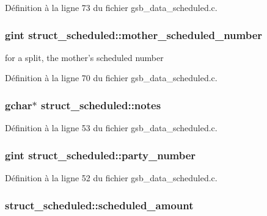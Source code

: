 Définition à la ligne 73 du fichier gsb\_\-data\_\-scheduled.c.

\subsubsection[{mother\_\-scheduled\_\-number}]{\setlength{\rightskip}{0pt plus 5cm}gint {\bf struct\_\-scheduled::mother\_\-scheduled\_\-number}}\label{structstruct__scheduled_a9bf031909d43bb5c36e1f0361b708586}
for a split, the mother's scheduled number 

Définition à la ligne 70 du fichier gsb\_\-data\_\-scheduled.c.

\subsubsection[{notes}]{\setlength{\rightskip}{0pt plus 5cm}gchar$\ast$ {\bf struct\_\-scheduled::notes}}\label{structstruct__scheduled_a4f450340b3955f3cad7a9cf4d683cf0b}


Définition à la ligne 53 du fichier gsb\_\-data\_\-scheduled.c.

\subsubsection[{party\_\-number}]{\setlength{\rightskip}{0pt plus 5cm}gint {\bf struct\_\-scheduled::party\_\-number}}\label{structstruct__scheduled_a74a0c0433e42cbe5da90556e112acb72}


Définition à la ligne 52 du fichier gsb\_\-data\_\-scheduled.c.

\subsubsection[{scheduled\_\-amount}]{ {\bf struct\_\-scheduled::scheduled\_\-amount}}\label{structstruct__scheduled_afe79d2de881f7d3d83fa731ed165884c}


